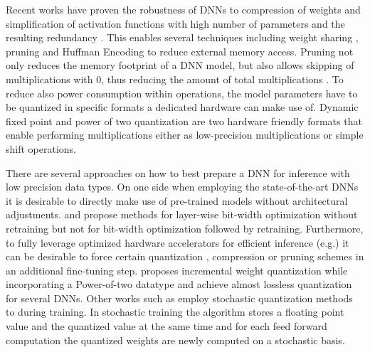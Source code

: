 Recent works \cite{Han2015,Zhou2017a} have proven the robustness of DNNs 
to compression of weights and simplification of activation functions with 
high number of parameters and the resulting redundancy \cite{Han2015, Chen2017, Lin2015a, Courbariaux2014}. This enables several techniques including weight sharing \cite{Han2015, Dong2017}, pruning \cite{Han2015a} and Huffman Encoding \cite{Han2015} to reduce external memory access. Pruning not only reduces the memory footprint of a DNN model, but also allows skipping of multiplications with 0, thus reducing the amount of total multiplications \cite{Yang2017, Yu2017}. To reduce also power consumption within operations, the model parameters have to be quantized in specific formats a dedicated hardware can make use of.
Dynamic fixed point \cite{Courbariaux2014, Gysel2016a} and power of two quantization \cite{Zhou2017a} are two hardware friendly formats that enable performing multiplications either as low-precision multiplications or simple shift operations. %

There are several approaches on how to best prepare a DNN for inference with 
low precision data types. On one side when employing the state-of-the-art DNNs 
it is desirable to directly make use of pre-trained models without architectural
adjustments. \cite{Lin2015a} and \cite{Zhou2017} propose methods for layer-wise 
bit-width optimization without retraining but not for bit-width optimization 
followed by retraining. Furthermore, to fully leverage optimized hardware 
accelerators for efficient inference (e.g.\cite{han2016eie}) it can be desirable 
to force certain quantization \cite{Zhou2017a}, compression or pruning schemes 
\cite{Yang2017} in an additional fine-tuning step. \cite{Zhou2017a} proposes 
incremental weight quantization while incorporating a Power-of-two datatype and 
achieve almost lossless quantization for several DNNs. Other works such as 
\cite{Gysel2016, Hubara2016} employ stochastic quantization methods to during 
training. In stochastic training the algorithm stores a floating point value and 
the quantized value at the same time and for each feed forward computation the 
quantized weights are newly computed on a stochastic basis.

